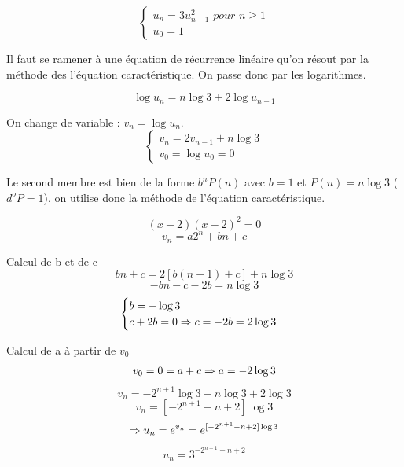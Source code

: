 \begin{exercice}

\[ \begin{cases} u_n=3u_{n-1}^2 \textit{ pour } n \ge 1 \\ u_0=1 \end{cases} \]

Il faut se ramener à une équation de récurrence linéaire qu'on résout par la méthode des l'équation caractéristique. On passe donc par les logarithmes.

\[ \log u_n =n\log 3+2\log u_{n-1} \]

On change de variable : $v_n=\log u_n$.
\[ \begin{cases} v_n=2v_{n-1}+n\log 3 \\
v_0=\log u_0=0 \end{cases} \]

Le second membre est bien de la forme $b^nP(n)$ avec $b=1$ et $P(n)=n\log 3$ ($d^o P=1$), on utilise donc la méthode de l'équation caractéristique.

\[ (x-2)(x-2)^2=0 \]
\[ v_n=a2^n+bn+c \]

Calcul de b et de c
\[ bn+c=2[b(n-1)+c]+n\log 3 \]
\[ -bn-c-2b=n\log 3\]
\[ \begin{cases} b=-\log 3 \\ c+2b=0 \Rightarrow c=-2b=2\log 3 \end{cases} \]

Calcul de a à partir de $v_0$
\[ v_0=0=a+c \Rightarrow a=-2\log 3 \]
\[ v_n=-2^{n+1}\log 3-n\log 3+2\log3 \]
\[ v_n=[-2^{n+1}-n+2]\log 3 \]
\[ \Rightarrow u_n=e^{v_n}=e^{[-2^{n+1}-n+2]\log 3} \]
\[ u_n=3^{-2^{n+1}-n+2} \]

\end{exercice}

